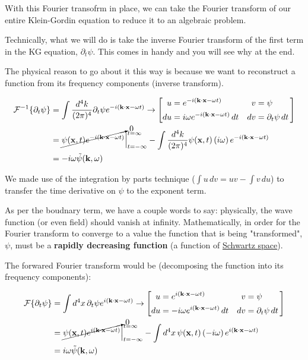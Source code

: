 With this Fourier transofrm in place, we can take the Fourier transform of our entire
Klein-Gordin equation to reduce it to an algebraic problem.

Technically, what we will do is take the inverse Fourier transform of the first term in the KG equation,
$\partial_t \psi$.
This comes in handy and you will see why at the end.

The physical reason to go about it this way is because we want to reconstruct a function from its frequency
components (inverse transform).

\begin{align*}
\mathcal{F}^{-1}\{ \partial_t \psi \} &=
    \int \frac{d^4k}{(2\pi)^4} \partial_t \psi e^{-i(\boldsymbol{\mathbf{k}}\cdot\boldsymbol{\mathbf{x}} - \omega t)}
\rightarrow
\left[
    \begin{alignedat}{2}
        u  &= e^{-i(\boldsymbol{\mathbf{k}}\cdot\boldsymbol{\mathbf{x}} - \omega t)}                \quad & v  &= \psi \\
        du &= i\omega e^{-i(\boldsymbol{\mathbf{k}}\cdot\boldsymbol{\mathbf{x}} - \omega t)} \, dt  \quad & dv &= \partial_t \psi \, dt
    \end{alignedat}\,
\right] \\
&= \cancelto{0}{ \psi(\boldsymbol{\mathbf{x}}, t) e^{-i(\boldsymbol{\mathbf{k}}\cdot\boldsymbol{\mathbf{x}} - \omega t)} } \Big|_{t=-\infty}^{t=\infty}
    - \int \frac{d^4k}{(2\pi)^4} \psi(\boldsymbol{\mathbf{x}}, t) \left(i\omega\right) e^{-i(\boldsymbol{\mathbf{k}}\cdot\boldsymbol{\mathbf{x}} - \omega t)} \\
&= -i\omega \tilde{\psi} (\boldsymbol{\mathbf{k}}, \omega)
\end{align*}

We made use of the integration by parts technique ($\int u \, dv = uv - \int v \, du$) to transfer the time derivative
on $\psi$ to the exponent term.

As per the boudnary term, we have a couple words to say: physically, the wave function (or even field) should vanish at infinity.
Mathematically, in order for the Fourier transform to converge to a value the function that is being "transformed", $\psi$,
must be a \textbf{rapidly decreasing function} (a function of \href{https://en.wikipedia.org/wiki/Schwartz_space}{Schwartz space}).

The forwared Fourier transform would be (decomposing the function into its frequency components):

\begin{align*}
\mathcal{F}\{ \partial_t \psi \} &=
    \int d^4x\, \partial_t \psi e^{i(\boldsymbol{\mathbf{k}}\cdot\boldsymbol{\mathbf{x}} - \omega t)}
\rightarrow
\left[
    \begin{alignedat}{2}
        u  &= e^{i(\boldsymbol{\mathbf{k}}\cdot\boldsymbol{\mathbf{x}} - \omega t)}                \quad & v  &= \psi \\
        du &= -i\omega e^{i(\boldsymbol{\mathbf{k}}\cdot\boldsymbol{\mathbf{x}} - \omega t)} \, dt  \quad & dv &= \partial_t \psi \, dt
    \end{alignedat}\,
\right] \\
&= \cancelto{0}{ \psi(\boldsymbol{\mathbf{x}}, t) e^{i(\boldsymbol{\mathbf{k}}\cdot\boldsymbol{\mathbf{x}} - \omega t)} } \Big|_{t=-\infty}^{t=\infty}
    - \int d^4x\, \psi(\boldsymbol{\mathbf{x}}, t) \left(-i\omega\right) e^{i(\boldsymbol{\mathbf{k}}\cdot\boldsymbol{\mathbf{x}} - \omega t)} \\
&= i\omega \tilde{\psi} (\boldsymbol{\mathbf{k}}, \omega)
\end{align*}



